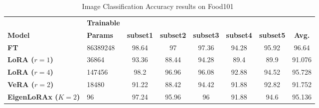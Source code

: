 \begin{table}[h]
    \centering
    \caption{Image Classification Accuracy results on Food101~\citep{food101}}
    \begin{tabular}{llcccccc}
        \toprule
         & \textbf{Trainable} & &  &  &  &  & \\
        \textbf{Model} & \textbf{Params} & \textbf{subset1} & \textbf{subset2} & \textbf{subset3} & \textbf{subset4} & \textbf{subset5} & \textbf{Avg.} \\ 
        \midrule
        \textbf{FT}               & 86389248             & 98.64                       & 97                          & 97.36                       & 94.28                       & 95.92                       & 96.64                       \\
\textbf{LoRA ($r=1$)}   & 36864                & 93.36                      & 88.44                       & 94.28                       & 89.4                        & 89.9                        & 91.076                      \\
\textbf{LoRA ($r=4$)}   & 147456               & 98.2                        & 96.96                       & 96.08                       & 92.88                       & 94.52                       & 95.728                      \\
\textbf{VeRA ($r=2$)}   & 18480                & 91.22                       & 88.42                       & 94.42                       & 91.88                       & 92.82                       & 91.752                      \\
\textbf{EigenLoRAx ($K=2$)} & 96                   & 97.24                       & 95.96                       & 96                          & 91.88                       & 94.6                        & 95.136                      \\
            \bottomrule
    \end{tabular}
    \label{tab:appendix_food101}
\end{table}

